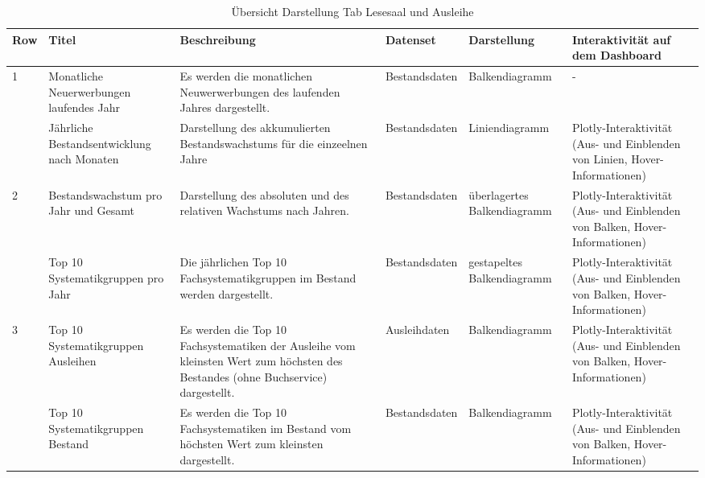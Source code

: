     \begingroup
    \setlength{\tabcolsep}{12pt} %
    \renewcommand{\arraystretch}{1.5} 
    \begin{table}[H]
        \centering
        \begin{adjustbox}{max width=\textwidth}
        \begin{tabular}{p{}p{}p{}p{}p{}p{}}
           \toprule
           Row        &Titel &Beschreibung &Datenset &Darstellung &Interaktivität auf dem Dashboard\\
           \midrule
            1           &Monatliche Neuerwerbungen laufendes Jahr&Es werden die monatlichen Neuwerwerbungen des laufenden Jahres dargestellt.&Bestandsdaten&Balkendiagramm&-\\
                        &Jährliche Bestandsentwicklung nach Monaten&Darstellung des akkumulierten Bestandswachstums für die einzeelnen Jahre&Bestandsdaten&Liniendiagramm    &Plotly-Interaktivität (Aus- und Einblenden von Linien, Hover-Informationen)\\          
            \midrule
            2           &Bestandswachstum pro Jahr und Gesamt&Darstellung des absoluten und des relativen Wachstums nach Jahren.&Bestandsdaten&überlagertes Balkendiagramm&Plotly-Interaktivität (Aus- und Einblenden von Balken, Hover-Informationen)\\
                        &Top 10 Systematikgruppen pro Jahr&Die jährlichen Top 10 Fachsystematikgruppen im Bestand werden dargestellt.&Bestandsdaten    &gestapeltes Balkendiagramm&Plotly-Interaktivität (Aus- und Einblenden von Balken, Hover-Informationen)\\
            \midrule
            3           &Top 10 Systematikgruppen Ausleihen&Es werden die Top 10 Fachsystematiken der Ausleihe vom kleinsten Wert zum höchsten des Bestandes (ohne Buchservice) dargestellt.&Ausleihdaten&Balkendiagramm&Plotly-Interaktivität (Aus- und Einblenden von Balken, Hover-Informationen)\\
                        &Top 10 Systematikgruppen Bestand&Es werden die Top 10 Fachsystematiken im Bestand vom höchsten Wert zum kleinsten dargestellt.&Bestandsdaten&Balkendiagramm&Plotly-Interaktivität (Aus- und Einblenden von Balken, Hover-Informationen)\\

        \bottomrule
        \end{tabular}
        \end{adjustbox}
        \caption{%
            Übersicht Darstellung Tab Lesesaal und Ausleihe
        }
        \label{tab:Darstellung Tab Lesesaal und Ausleihe}
        \end{table}
    \endgroup

